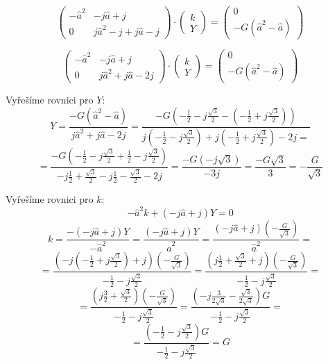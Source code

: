 \documentclass{article}
\begin{document}
$$
    \begin{pmatrix}
        -\hat{a}^2 & - j \hat{a} + j                 \\
        0          & j \hat{a}^2 - j + j \hat{a} - j
    \end{pmatrix}
    \cdot
    \begin{pmatrix}
        k \\
        Y
    \end{pmatrix}
    =
    \begin{pmatrix}
        0 \\
        - G (\hat{a}^2 - \hat{a})
    \end{pmatrix}
$$

$$
    \begin{pmatrix}
        -\hat{a}^2 & - j \hat{a} + j               \\
        0          & j \hat{a}^2 + j \hat{a} - 2 j
    \end{pmatrix}
    \cdot
    \begin{pmatrix}
        k \\
        Y
    \end{pmatrix}
    =
    \begin{pmatrix}
        0 \\
        - G (\hat{a}^2 - \hat{a})
    \end{pmatrix}
$$

Vyřešíme rovnici pro $Y$:
$$
    Y = \frac{- G (\hat{a}^2 - \hat{a})}{j \hat{a}^2 + j \hat{a} - 2 j} = \frac{
        - G \left( -\frac{1}{2} - j \frac{\sqrt{3}}{2} - \left( -\frac{1}{2} + j \frac{\sqrt{3}}{2} \right) \right)
    }{
        j \left( -\frac{1}{2} - j \frac{\sqrt{3}}{2} \right) + j \left( -\frac{1}{2} + j \frac{\sqrt{3}}{2} \right) - 2 j =
    }
$$
$$
    = \frac{
        - G \left( -\frac{1}{2} - j \frac{\sqrt{3}}{2} + \frac{1}{2} - j \frac{\sqrt{3}}{2} \right)
    }{
        -j \frac{1}{2} + \frac{\sqrt{3}}{2} - j \frac{1}{2} - \frac{\sqrt{3}}{2} - 2 j
    } = \frac{
        - G \left( -j \sqrt{3} \right)
    }{
        -3 j
    } = \frac{- G \sqrt{3}}{3} = -\frac{G}{\sqrt{3}}
$$

Vyřešíme rovnici pro $k$:
$$
    -\hat{a}^2 k + (-j \hat{a} + j) Y = 0
$$
$$
    k = \frac{- (-j \hat{a} + j) Y}{-\hat{a}^2} = \frac{(-j \hat{a} + j) Y}{\hat{a}^2} = \frac{(-j \hat{a} + j) \left( -\frac{G}{\sqrt{3}} \right)}{\hat{a}^2} =
$$
$$
    = \frac{
        \left( -j \left( -\frac{1}{2} + j \frac{\sqrt{3}}{2} \right) + j \right) \left( -\frac{G}{\sqrt{3}} \right)
    }{
        -\frac{1}{2} - j \frac{\sqrt{3}}{2}
    } = \frac{
        \left( j \frac{1}{2} + \frac{\sqrt{3}}{2} + j \right) \left( -\frac{G}{\sqrt{3}} \right)
    }{
        -\frac{1}{2} - j \frac{\sqrt{3}}{2}
    } =
$$
$$
    = \frac{
        \left( j \frac{3}{2} + \frac{\sqrt{3}}{2} \right) \left( -\frac{G}{\sqrt{3}} \right)
    }{
        -\frac{1}{2} - j \frac{\sqrt{3}}{2}
    } = \frac{
        \left( - j \frac{3}{2 \sqrt{3}} - \frac{\sqrt{3}}{2 \sqrt{3}} \right) G
    }{
        -\frac{1}{2} - j \frac{\sqrt{3}}{2}
    } =
$$
$$
    = \frac{
        \left( -\frac{1}{2} - j \frac{\sqrt{3}}{2} \right) G
    }{
        -\frac{1}{2} - j \frac{\sqrt{3}}{2}
    } = G
$$
\end{document}
